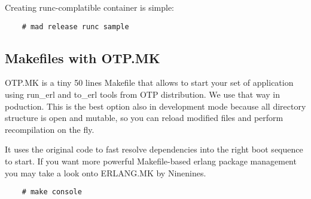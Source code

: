 Creating runc-complatible container is simple:

\vspace{1\baselineskip}
\begin{lstlisting}
    # mad release runc sample
\end{lstlisting}
\vspace{1\baselineskip}

\subsection{Makefiles with OTP.MK}

OTP.MK is a tiny 50 lines Makefile that allows to start your set
of application using run\_erl and to\_erl tools from OTP distribution.
We use that way in poduction. This is the best option also in
development mode because all directory structure is open and mutable,
so you can reload modified files and perform recompilation on the fly.

It uses the original code to fast resolve dependencies into the right
boot sequence to start. If you want more powerful Makefile-based erlang
package management you may take a look onto ERLANG.MK by Ninenines.

\vspace{1\baselineskip}
\begin{lstlisting}
    # make console
\end{lstlisting}
\vspace{1\baselineskip}

